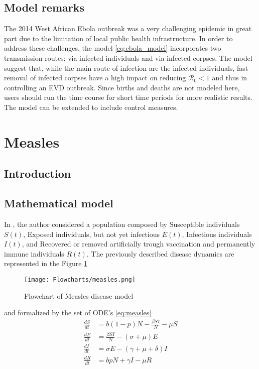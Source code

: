 \documentclass{book}\usepackage[]{graphicx}\usepackage[]{color}
\begin{document}

\subsection*{Model remarks}
The 2014 West African Ebola outbreak was a very challenging epidemic in great part due to the limitation of local public health infrastructure.
In order to address these challenges, the model \eqref{eq:ebola_model} incorporates two transmission routes: via infected individuals and via infected corpses. The model suggest that, while the main route of infection are the infected individuals, fast removal of infected corpses have a high impact on reducing $\mathcal{R}_0<1$ and thus in controlling an EVD outbreak.
Since births and deaths are not modeled here, users should run the time course for short time periods for more realistic results. The model can be extended to include control measures.


\section{Measles}
\subsection*{Introduction}

\subsection*{Mathematical model}
In \cite{tessa2006mathematical}, the author considered a population composed by Susceptible individuals $S(t)$, Exposed individuals, but not yet infectious $E(t)$, Infectious individuals $I(t)$, and Recovered or removed artificially trough vaccination and permanently immune individuals $R(t)$.
%
The previously described disease dynamics are represented in the Figure \ref{fig:measles_flow}
\begin{figure}[H]
    \centering
    \texttt{[image: Flowcharts/measles.png]}
    \caption{Flowchart of Measles disease model}
    \label{fig:measles_flow}
\end{figure}
%
and formalized by the set of ODE's \eqref{eq:measles}
\begin{equation}
\label{eq:measles}
\begin{aligned}
\frac{d S}{d t} &=b(1-p) N-\frac{\beta S I}{N}-\mu S \\
\frac{d E}{d t} &=\frac{\beta S I}{N}-(\sigma+\mu) E \\
\frac{d I}{d t} &=\sigma E-(\gamma+\mu+\delta) I \\
\frac{d R}{d t} &=b p N+\gamma I-\mu R
\end{aligned}
\end{equation}
\end{document}
